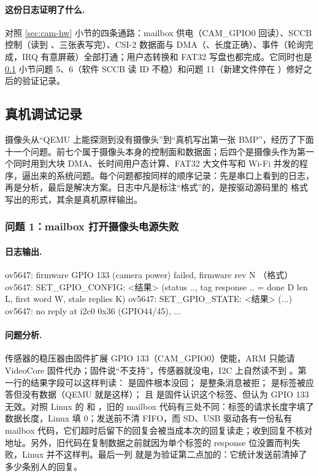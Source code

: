 \paragraph{这份日志证明了什么.} 对照 \ref{sec:cam-hw} 小节的四条通路：mailbox 供电（CAM\_GPIO0 回读）、SCCB 控制（读到 、三张表写完）、CSI-2 数据面与 DMA（、长度正确）、事件（轮询完成，IRQ 有意屏蔽）全部打通；用户态转换和 FAT32 写盘也都完成。它同时也是 \ref{sec:cam-bugs} 小节问题 5、6（软件 SCCB 读 ID 不稳）和问题 11（新建文件停在 ）修好之后的验证记录。

\subsection{真机调试记录}
\label{sec:cam-bugs}

摄像头从“QEMU 上能探测到没有摄像头”到“真机写出第一张 BMP”，经历了下面十一个问题。前七个属于摄像头本身的控制面和数据面；后四个是摄像头作为第一个同时用到大块 DMA、长时间用户态计算、FAT32 大文件写和 Wi-Fi 并发的程序，逼出来的系统问题。每个问题都按同样的顺序记录：先是串口上看到的日志，再是分析，最后是解决方案。日志中凡是标注“格式”的，是按驱动源码里的  格式写出的形式，其余是真机原样输出。

\subsubsection{问题 1：mailbox 打开摄像头电源失败}

\paragraph{日志输出.}
\begin{txtcode}
ov5647: firmware GPIO 133 (camera power) failed, firmware rev N          （格式）
ov5647:   SET_GPIO_CONFIG: <结果> (status .., tag response .. = done D len L,
          first word W, stale replies K)
ov5647:   SET_GPIO_STATE:  <结果> (...)
ov5647: no reply at i2c0 0x36 (GPIO44/45), ...
\end{txtcode}

\paragraph{问题分析.} 传感器的稳压器由固件扩展 GPIO 133（CAM\_GPIO0）使能，ARM 只能请 VideoCore 固件代办；固件说“不支持”，传感器就没电，I2C 上自然读不到 。第一行的结果字段可以这样判读： 是固件根本没回； 是整条消息被拒； 是标签被应答但没有数据（QEMU 就是这样）； 且  是固件认识这个标签、但认为 GPIO 133 无效。对照 Linux 的  和 ，旧的 mailbox 代码有三处不同：标签的请求长度字填了数据长度，Linux 填 0；发送前不清 FIFO，而 SD、USB 驱动各有一份私有 mailbox 代码，它们超时后留下的回复会被当成本次的回复读走；收到回复不核对地址。另外，旧代码在复制数据之前就因为单个标签的 response 位没置而判失败，Linux 并不这样判。最后一列  就是为验证第二点加的：它统计发送前清掉了多少条别人的回复。

